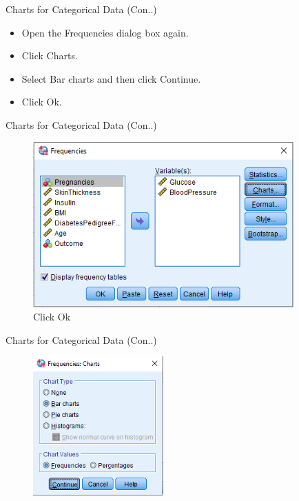 \begin{frame}[t]{Charts for Categorical Data (Con..)}
	 \begin{itemize}
	 	\item Open the Frequencies dialog box again.
	 	\item Click Charts.
	 	\item Select Bar charts and then click Continue.
	 	\item Click Ok.
	 \end{itemize}
\end{frame}
\begin{frame}[t]{Charts for Categorical Data (Con..)}
	\begin{figure}
		\centering
		\includegraphics[width=10cm]{img/freq_charts_1}
		\caption{Click Ok}
	\end{figure}
\end{frame}
\begin{frame}[t]{Charts for Categorical Data (Con..)}
	\begin{figure}
		\centering
		\includegraphics[width=5cm]{img/freq_charts_2}
	\end{figure}
\end{frame}
